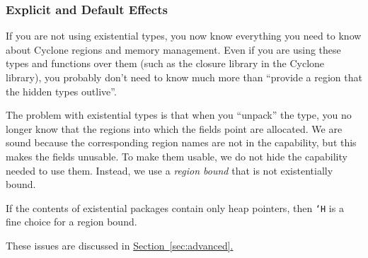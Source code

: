 \subsubsection{Explicit and Default Effects}

If you are not using existential types, you now know everything you
need to know about Cyclone regions and memory management.  Even if you
are using these types and functions over them (such as the closure
library in the Cyclone library), you probably don't need to know much more
than ``provide a region that the hidden types outlive''.

The problem with existential types is that when you ``unpack'' the
type, you no longer know that the regions into which the fields point
are allocated.  We are sound because the corresponding region names
are not in the capability, but this makes the fields unusable.  To
make them usable, we do not hide the capability needed to use them.
Instead, we use a \emph{region bound} that is not existentially
bound.  

If the contents of existential packages contain only heap pointers,
then \texttt{`H} is a fine choice for a region bound.

These issues are discussed in
\hyperref[sec:advanced]{Section~\ref{sec:advanced}.}






